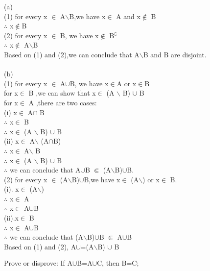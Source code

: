 \documentclass[11pt, a4paper, UTF8]{ctexart}
\begin{document}
\begin{solution}
(a)\\
(1) for every x $\in$ A$\backslash$B,we have x$\in$ A and x$\notin$ B\\
$\therefore$ x$\notin$B\\
(2) for every x $\in$ B, we have x$\notin$ B$^\complement$ \\
$\therefore$ x$\notin$ A$\backslash$B\\
Based on (1) and (2),we can conclude that A$\backslash$B and B are disjoint.\\
\\
(b)\\
(1) for every x $\in$ A$\cup$B, we have x$\in$A or x$\in$B\\
for x$\in$ B ,we can show that x$\in$ (A $\backslash$ B) $\cup$ B\\
for x$\in$ A ,there are two cases:\\
\indent (i) x$\in$ A$\cap$ B\\
\indent \indent $\therefore$ x$\in$ B\\
\indent \indent $\therefore$ x$\in$ (A $\backslash$ B) $\cup$ B\\
\indent (ii) x$\in$ A$\backslash$ (A$\cap$B)\\
\indent \indent $\therefore$ x$\in$ A$\backslash$ B\\
\indent \indent $\therefore$ x$\in$ (A $\backslash$ B) $\cup$ B\\
$\therefore$ we can conclude that A$\cup$B $\Subset$ (A$\backslash$B)$\cup$B.\\
(2) for every x $\in$ (A$\backslash$B)$\cup$B,we have x$\in$ (A$\backslash$) or x$\in$ B.\\
\indent (i). x$\in$ (A$\backslash$)\\
\indent \indent $\therefore$ x$\in$ A\\
\indent \indent $\therefore$ x$\in$ A$\cup$B\\
\indent (ii).x$\in$ B\\
\indent \indent $\therefore$ x$\in$ A$\cup$B\\
$\therefore$ we can conclude that (A$\backslash$B)$\cup$B $\Subset$ A$\cup$B\\
Based on (1) and (2), A$\cup$=(A$\backslash$B) $\cup$ B\\
\end{solution}


\begin{problem}[UD:7.10]
Prove or disprove: If A$\cup$B=A$\cup$C, then B=C;
\end{problem}
\end{document}
